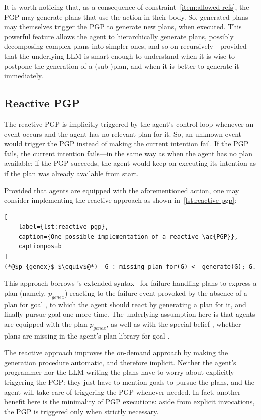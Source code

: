 \documentclass[12pt,a4paper,openright,twoside]{book}
\begin{document}
It is worth noticing that, as a consequence of constraint~\ref{item:allowed-refs}, the \ac{PGP} may generate plans that use the  action in their body.
%
So, generated plans may themselves trigger the \ac{PGP} to generate new plans, when executed.
%
This powerful feature allows the agent to hierarchically generate plans, possibly decomposing complex plans into simpler ones, and so on recursively---provided that the underlying \ac{LLM} is smart enough to understand when it is wise to postpone the generation of a (sub-)plan, and when it is better to generate it immediately.

\subsection{Reactive PGP}\label{sec:reactive-pgp}

The reactive \ac{PGP} is implicitly triggered by the agent's control loop whenever an event  occurs and the agent has no relevant plan for it.
%
So, an unknown event would trigger the \ac{PGP} instead of making the current intention fail.
%
If the \ac{PGP} fails, the current intention fails---in the same way as when the agent has no plan available; if the \ac{PGP} succeeds, the agent would keep on executing its intention as if the plan was already available from start.


Provided that agents are equipped with the aforementioned  action, one may consider implementing the reactive approach as shown in~\cref{lst:reactive-pgp}:
%
\begin{lstlisting}[
    label={lst:reactive-pgp},
    caption={One possible implementation of a reactive \ac{PGP}},
    captionpos=b
]
(*@$p_{genex}$ $\equiv$@*) -G : missing_plan_for(G) <- generate(G); G.
\end{lstlisting}
%
This approach borrows \jason{}'s extended \agentspeak{} syntax~\cite{BordiniHW2007} for failure handling plans to express a plan (namely, $p_{genex}$) reacting to the failure event provoked by the absence of a plan for goal , to which the agent should react by generating a plan for it, and finally pursue goal  one more time.
%
The underlying assumption here is that agents are equipped with the plan $p_{genex}$, as well as with the special belief , whether plans are missing in the agent's plan library for goal .

The reactive approach improves the on-demand approach by making the generation procedure automatic, and therefore implicit.
%
Neither the agent's programmer nor the \ac{LLM} writing the plans have to worry about explicitly triggering the \ac{PGP}: they just have to mention goals to pursue the plans, and the agent will take care of triggering the \ac{PGP} whenever needed.
%
In fact, another benefit here is the minimality of \ac{PGP} executions: aside from explicit invocations, the \ac{PGP} is triggered only when strictly necessary.
\end{document}
